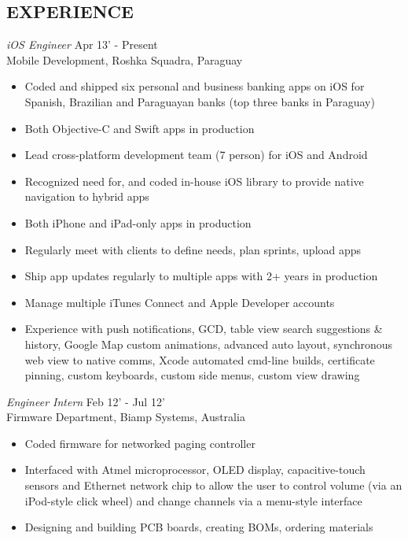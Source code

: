 \documentclass[margin]{res}
\begin{document}
\begin{resume}

\section{EXPERIENCE} {\sl iOS Engineer} \hfill Apr 13' - Present \\
                Mobile Development, Roshka Squadra, Paraguay  
                 \begin{itemize}  \itemsep -2pt %
                 \item Coded and shipped six personal and business banking apps on iOS for Spanish, Brazilian and Paraguayan banks (top three banks in Paraguay)
                 \item Both Objective-C and Swift apps in production
                 \item Lead cross-platform development team (7 person) for iOS and Android 
                 \item Recognized need for, and coded in-house iOS library to provide native navigation to hybrid apps
         	\item Both iPhone and iPad-only apps in production
		\item Regularly meet with clients to define needs, plan sprints, upload apps
		\item Ship app updates regularly to multiple apps with 2+ years in production
                 \item Manage multiple iTunes Connect and Apple Developer accounts
                 \item Experience with push notifications, GCD, table view search suggestions \& history, Google Map custom animations, advanced auto layout, synchronous web view to native comms, Xcode automated cmd-line builds, certificate pinning, custom keyboards, custom side menus, custom view drawing
                 \end{itemize}
 
                {\sl Engineer Intern} \hfill            Feb 12' - Jul 12' \\
                Firmware Department, Biamp Systems, Australia 
                 \begin{itemize}  \itemsep -2pt %
                 \item Coded firmware for networked paging controller
                 \item Interfaced with Atmel microprocessor,
                  OLED display, capacitive-touch sensors and Ethernet network chip to allow the user to 
                  control volume (via an iPod-style click wheel) and change channels via a menu-style interface 
                  \item Designing and building PCB boards, creating BOMs, ordering materials
                 \end{itemize} 
                   

\end{resume}
\end{document}
